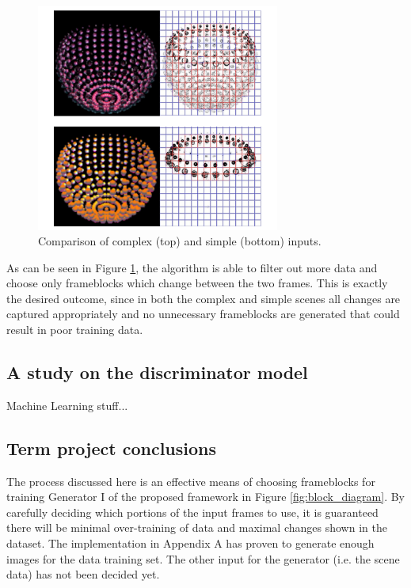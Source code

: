 \documentclass[conference]{IEEEtran}
\begin{document}
\begin{figure}[htbp]
\centerline{\includegraphics[width=8cm]{data_analysis.png}}
\caption{Comparison of complex (top) and simple (bottom) inputs.}
\label{fig:data_analysis}
\end{figure}

As can be seen in Figure \ref{fig:data_analysis}, the algorithm is able to filter
out more data and choose only frameblocks which change between the two frames.
This is exactly the desired outcome, since in both the complex and simple
scenes all changes are captured appropriately and no unnecessary frameblocks are
generated that could result in poor training data.

\subsection{A study on the discriminator model}
\label{subsec:discriminator}
Machine Learning stuff...

\subsection{Term project conclusions}
\label{subsec:term_conclusions}
The process discussed here is an effective means of choosing frameblocks
for training Generator I of the proposed framework in Figure \ref{fig:block_diagram}.
By carefully deciding which portions of the input frames to use,
it is guaranteed there will be minimal over-training of data and maximal changes shown in the dataset.
The implementation in Appendix A has proven to generate enough images for the
data training set.
The other input for the generator (i.e. the scene data) has not been decided yet.
\end{document}

